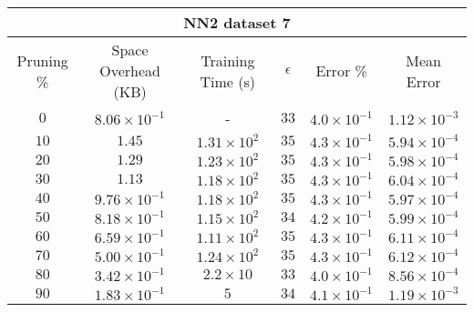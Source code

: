 \begin{adjustwidth}{0cm}{}
\begin{tabular}{cccccc}
\hline
\multicolumn{6}{c}{NN2 dataset 7} \\
\toprule
Pruning \% & Space Overhead (KB) & Training Time (s) & $\epsilon$ & Error \% & Mean Error\\
\midrule
$0$ & $8.06 \times 10^{-1}$ & - & $33$ & $4.0 \times 10^{-1}$ & $1.12 \times 10^{-3}$\\
$10$ & $1.45$ & $1.31 \times 10^{2}$ & $35$ & $4.3 \times 10^{-1}$ & $5.94 \times 10^{-4}$\\
$20$ & $1.29$ & $1.23 \times 10^{2}$ & $35$ & $4.3 \times 10^{-1}$ & $5.98 \times 10^{-4}$\\
$30$ & $1.13$ & $1.18 \times 10^{2}$ & $35$ & $4.3 \times 10^{-1}$ & $6.04 \times 10^{-4}$\\
$40$ & $9.76 \times 10^{-1}$ & $1.18 \times 10^{2}$ & $35$ & $4.3 \times 10^{-1}$ & $5.97 \times 10^{-4}$\\
$50$ & $8.18 \times 10^{-1}$ & $1.15 \times 10^{2}$ & $34$ & $4.2 \times 10^{-1}$ & $5.99 \times 10^{-4}$\\
$60$ & $6.59 \times 10^{-1}$ & $1.11 \times 10^{2}$ & $35$ & $4.3 \times 10^{-1}$ & $6.11 \times 10^{-4}$\\
$70$ & $5.00 \times 10^{-1}$ & $1.24 \times 10^{2}$ & $35$ & $4.3 \times 10^{-1}$ & $6.12 \times 10^{-4}$\\
$80$ & $3.42 \times 10^{-1}$ & $2.2 \times 10$ & $33$ & $4.0 \times 10^{-1}$ & $8.56 \times 10^{-4}$\\
$90$ & $1.83 \times 10^{-1}$ & $5$ & $34$ & $4.1 \times 10^{-1}$ & $1.19 \times 10^{-3}$\\
\bottomrule
\end{tabular}
\end{adjustwidth}

\par\null\par
\par\null\par

